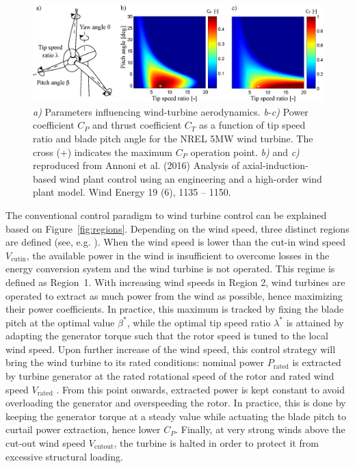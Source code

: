 \begin{figure}[t]
	\centering
	\includegraphics[width=\textwidth]{chapters/introduction/wt_drawing3.eps}
	\caption[Parameters influencing wind-turbine aerodynamics; Power coefficient $C_P$ and thrust coefficient $C_T$ as a function of tip speed ratio and blade pitch angle for the NREL 5MW wind turbine.]{\emph{a)} Parameters influencing wind-turbine aerodynamics. \emph{b-c)} Power coefficient $C_P$ and thrust coefficient $C_T$ as a function of tip speed ratio and blade pitch angle for the NREL 5MW wind turbine. The cross (+) indicates the maximum $C_P$ operation point. \emph{b)} and \emph{c)} reproduced from Annoni et al. (2016) Analysis of axial-induction-based wind plant control using an engineering and a high-order wind plant model. Wind Energy 19 (6), 1135 -- 1150. \label{fig:WT_drawing}}
\end{figure}

The conventional control paradigm to wind turbine control can be explained based on Figure~\ref{fig:regions}. Depending on the wind speed, three distinct regions are defined (see, e.g. \citealp{johnson2006control,laks2009control,pao2009tutorial}). When the wind speed is lower than the cut-in wind speed $V_{\text{cutin}}$, the available power in the wind is insufficient to overcome losses in the energy conversion system and the wind turbine is not operated. This regime is defined as Region~1. With increasing wind speeds in Region 2, wind turbines are operated to extract as much power from the wind as possible, hence maximizing their power coefficients. In practice, this maximum is tracked by fixing the blade pitch at the optimal value $\beta^*$, while the optimal tip speed ratio $\lambda^*$ is attained by adapting the generator torque such that the rotor speed is tuned to the local wind speed. Upon further increase of the wind speed, this control strategy will bring the wind turbine to its rated conditions: nominal power $P_{\text{rated}}$ is extracted by turbine generator at the rated rotational speed of the rotor and rated wind speed $V_{\text{rated}}$ . From this point onwards, extracted power is kept constant to avoid overloading the generator and overspeeding the rotor. In practice, this is done by keeping the generator torque at a steady value while actuating the blade pitch to curtail power extraction, hence lower $C_P$. Finally, at very strong winds above the cut-out wind speed $V_\text{cutout}$, the turbine is halted in order to protect it from excessive structural loading. 

